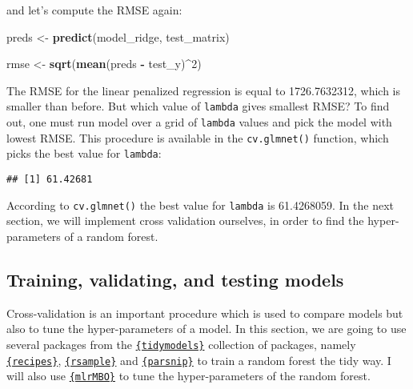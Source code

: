 \documentclass[
]{article}
\newenvironment{Shaded}{\begin{snugshade}}{\end{snugshade}}
\newcommand{\CommentTok}[1]{\textcolor[rgb]{0.56,0.35,0.01}{\textit{#1}}}
\newcommand{\DecValTok}[1]{\textcolor[rgb]{0.00,0.00,0.81}{#1}}
\newcommand{\KeywordTok}[1]{\textcolor[rgb]{0.13,0.29,0.53}{\textbf{#1}}}
\newcommand{\NormalTok}[1]{#1}
\newcommand{\OperatorTok}[1]{\textcolor[rgb]{0.81,0.36,0.00}{\textbf{#1}}}
\newcommand{\StringTok}[1]{\textcolor[rgb]{0.31,0.60,0.02}{#1}}
\begin{document}
and let's compute the RMSE again:

\begin{Shaded}
\begin{Highlighting}[]
\NormalTok{preds \textless{}{-}}\StringTok{ }\KeywordTok{predict}\NormalTok{(model\_ridge, test\_matrix)}

\NormalTok{rmse \textless{}{-}}\StringTok{ }\KeywordTok{sqrt}\NormalTok{(}\KeywordTok{mean}\NormalTok{(preds }\OperatorTok{{-}}\StringTok{ }\NormalTok{test\_y)}\OperatorTok{\^{}}\DecValTok{2}\NormalTok{)}
\end{Highlighting}
\end{Shaded}

The RMSE for the linear penalized regression is equal to 1726.7632312, which is smaller than before.
But which value of \texttt{lambda} gives smallest RMSE? To find out, one must run model over a grid of
\texttt{lambda} values and pick the model with lowest RMSE. This procedure is available in the \texttt{cv.glmnet()}
function, which picks the best value for \texttt{lambda}:

\begin{Shaded}
\end{Shaded}

\begin{verbatim}
## [1] 61.42681
\end{verbatim}

According to \texttt{cv.glmnet()} the best value for \texttt{lambda} is 61.4268059. In the
next section, we will implement cross validation ourselves, in order to find the hyper-parameters
of a random forest.

\hypertarget{training-validating-and-testing-models}{%
\subsection{Training, validating, and testing models}\label{training-validating-and-testing-models}}

Cross-validation is an important procedure which is used to compare models but also to tune the
hyper-parameters of a model. In this section, we are going to use several packages from the
\href{https://github.com/tidymodels}{\texttt{\{tidymodels\}}} collection of packages, namely
\href{https://tidymodels.github.io/recipes/}{\texttt{\{recipes\}}},
\href{https://tidymodels.github.io/rsample/}{\texttt{\{rsample\}}} and
\href{https://tidymodels.github.io/parsnip/}{\texttt{\{parsnip\}}} to train a random forest the tidy way. I will
also use \href{http://mlrmbo.mlr-org.com/}{\texttt{\{mlrMBO\}}} to tune the hyper-parameters of the random forest.
\end{document}
